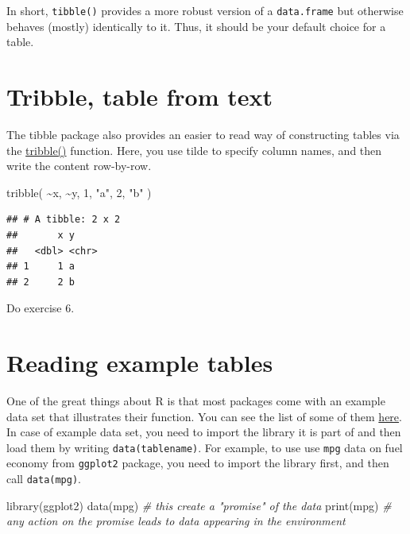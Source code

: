 \documentclass[
]{book}
\newenvironment{Shaded}{\begin{snugshade}}{\end{snugshade}}
\newcommand{\CommentTok}[1]{\textcolor[rgb]{0.56,0.35,0.01}{\textit{#1}}}
\newcommand{\DecValTok}[1]{\textcolor[rgb]{0.00,0.00,0.81}{#1}}
\newcommand{\FunctionTok}[1]{\textcolor[rgb]{0.00,0.00,0.00}{#1}}
\newcommand{\NormalTok}[1]{#1}
\newcommand{\SpecialCharTok}[1]{\textcolor[rgb]{0.00,0.00,0.00}{#1}}
\newcommand{\StringTok}[1]{\textcolor[rgb]{0.31,0.60,0.02}{#1}}
\begin{document}
In short, \texttt{tibble()} provides a more robust version of a \texttt{data.frame} but otherwise behaves (mostly) identically to it. Thus, it should be your default choice for a table.

\hypertarget{tribble}{%
\section{Tribble, table from text}\label{tribble}}

The tibble package also provides an easier to read way of constructing tables via the \href{https://tibble.tidyverse.org/reference/tribble.html}{tribble()} function. Here, you use tilde to specify column names, and then write the content row-by-row.

\begin{Shaded}
\begin{Highlighting}[]
\FunctionTok{tribble}\NormalTok{(}
    \SpecialCharTok{\textasciitilde{}}\NormalTok{x, }\SpecialCharTok{\textasciitilde{}}\NormalTok{y,}
    \DecValTok{1}\NormalTok{,  }\StringTok{"a"}\NormalTok{,}
    \DecValTok{2}\NormalTok{,  }\StringTok{"b"}
\NormalTok{)}
\end{Highlighting}
\end{Shaded}

\begin{verbatim}
## # A tibble: 2 x 2
##       x y    
##   <dbl> <chr>
## 1     1 a    
## 2     2 b
\end{verbatim}

Do exercise 6.

\hypertarget{data}{%
\section{Reading example tables}\label{data}}

One of the great things about R is that most packages come with an example data set that illustrates their function. You can see the list of some of them \href{https://www.rdocumentation.org/packages/datasets}{here}. In case of example data set, you need to import the library it is part of and then load them by writing \texttt{data(tablename)}. For example, to use use \texttt{mpg} data on fuel economy from \texttt{ggplot2} package, you need to import the library first, and then call \texttt{data(mpg)}.

\begin{Shaded}
\begin{Highlighting}[]
\FunctionTok{library}\NormalTok{(ggplot2)}
\FunctionTok{data}\NormalTok{(mpg) }\CommentTok{\# this create a "promise" of the data}
\FunctionTok{print}\NormalTok{(mpg) }\CommentTok{\# any action on the promise leads to data appearing in the environment}
\end{Highlighting}
\end{Shaded}
\end{document}
